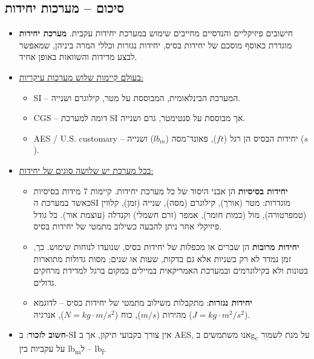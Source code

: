 \documentclass[
  hebrew,
  letterpaper,
  DIV=11,
  numbers=noendperiod]{scrreprt}
\providecommand{\tightlist}{%
  \setlength{\itemsep}{0pt}\setlength{\parskip}{0pt}}
\begin{document}
\subsection{\texorpdfstring{{סיכום -- מערכות
יחידות}}{סיכום -- מערכות יחידות}}\label{ux5e1ux5d9ux5dbux5d5ux5dd-ux5deux5e2ux5e8ux5dbux5d5ux5ea-ux5d9ux5d7ux5d9ux5d3ux5d5ux5ea}

\begin{itemize}
\tightlist
\item
  {חישובים פיזיקליים והנדסיים מחייבים שימוש במערכת יחידות עקבית.
  \textbf{מערכת יחידות} מוגדרת כאוסף מוסכם של יחידות בסיס, יחידות נגזרות
  וכללי המרה ביניהן, שמאפשר לבצע מדידות והשוואות באופן אחיד.}
\item
  \ul{בעולם קיימות שלוש מערכות עיקריות:}

  \begin{itemize}
  \tightlist
  \item
    SI -- המערכת הבינלאומית, המבוססת על מטר, קילוגרם ושנייה.
  \item
    CGS -- דומה למערכת SI אך מבוססת על סנטימטר, גרם ושנייה.
  \item
    AES / U.S. customary -- יחידות הבסיס הן רגל (\(ft\)), פאונד־מסה
    (\(lb_m\)) ושנייה (\(s\)).
  \end{itemize}
\item
  \ul{בכל מערכת יש שלושה סוגים של יחידות:}

  \begin{itemize}
  \tightlist
  \item
    {\textbf{יחידות בסיסיות} הן אבני היסוד של כל מערכת יחידות. קיימות 7
    מידות בסיסיות כאשר במערכת ה}SI {מוגדרות: מטר (אורך), קילוגרם (מסה),
    שנייה (זמן), קלווין (טמפרטורה), מול (כמות חומר), אמפר (זרם חשמלי)
    וקנדלה (עוצמת אור). כל גודל פיזיקלי אחר ניתן להבעה כשילוב מתמטי של
    יחידות בסיס.}
  \item
    {\textbf{יחידות מרובות} הן שברים או מכפלות של יחידות בסיס, שנועדו
    לנוחות שימוש. כך, זמן נמדד לא רק בשניות אלא גם בדקות, שעות או שנים;
    מסות גדולות מתוארות בטונות ולא בקילוגרמים ובמערכת האמריקאית במיילים
    במקום ברגל למדידת מרחקים גדולים.}
  \item
    {\textbf{יחידות נגזרות}: מתקבלות משילוב מתמטי של יחידות בסיס --
    לדוגמא}\\
    {מהירות (}\(m/s\){), כוח (}\(N = kg \cdot m/s^{2}\){), אנרגיה
    (}\(J = kg \cdot m^{2}/s^{2}\){).}
  \end{itemize}
\item
  {\textbf{חשוב לזכור}: ב-}SI {אין צורך בקבועי תיקון, אך ב} AES{, אנו
  משתמשים ב}g\textsubscript{c} {על מנת לשמור על עקביות בין}
  lb\textsubscript{m}{ל --} lb\textsubscript{f}{.}
\end{itemize}
\end{document}

